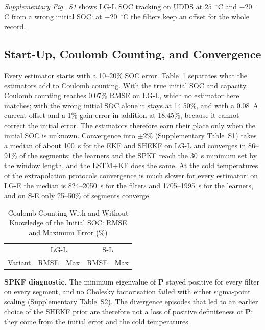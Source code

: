 \documentclass[journal]{IEEEtran}
\newcommand{\mP}{\mathbf{P}}
\begin{document}
\noindent\textit{Supplementary Fig.~S1} shows LG-L SOC tracking on UDDS at $25$~$^\circ$C and $-20$~$^\circ$C from a wrong initial SOC: at $-20$~$^\circ$C the filters keep an offset for the whole record.

\subsection{Start-Up, Coulomb Counting, and Convergence}\label{sec:checks}
Every estimator starts with a 10--20\% SOC error. Table~\ref{tab:cc} separates what the estimators add to Coulomb counting. With the true initial SOC and capacity, Coulomb counting reaches 0.07\% RMSE on LG-L, which no estimator here matches; with the wrong initial SOC alone it stays at 14.50\%, and with a 0.08~A current offset and a 1\% gain error in addition at 18.45\%, because it cannot correct the initial error. The estimators therefore earn their place only when the initial SOC is unknown. Convergence into $\pm2$\% (Supplementary Table~S1) takes a median of about 100~s for the EKF and SHEKF on LG-L and converges in 86--91\% of the segments; the learners and the SPKF reach the 30~s minimum set by the window length, and the LSTM+KF does the same. At the cold temperatures of the extrapolation protocols convergence is much slower for every estimator: on LG-E the median is 824--2050~s for the filters and 1705--1995~s for the learners, and on S-E only 25--50\% of segments converge.

\begin{table}[!t]
\caption{Coulomb Counting With and Without Knowledge of the Initial SOC: RMSE and Maximum Error (\%)}
\label{tab:cc}
\centering\scriptsize
\setlength{\tabcolsep}{3pt}
\begin{tabular}{@{}lcccc@{}}
\toprule
 & \multicolumn{2}{c}{LG-L} & \multicolumn{2}{c}{S-L}\\
Variant & RMSE & Max & RMSE & Max\\
\midrule

\end{tabular}
\end{table}

\textbf{SPKF diagnostic.} The minimum eigenvalue of $\mP$ stayed positive for every filter on every segment, and no Cholesky factorisation failed with either sigma-point scaling (Supplementary Table~S2). The divergence episodes that led to an earlier choice of the SHEKF prior are therefore not a loss of positive definiteness of $\mP$; they come from the initial error and the cold temperatures.
\end{document}
